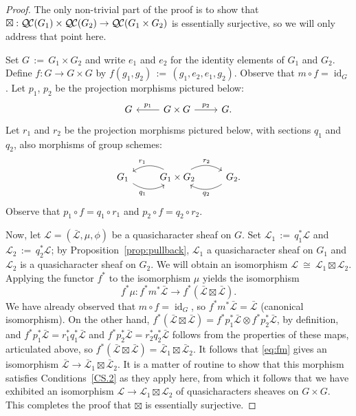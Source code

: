\documentclass[11pt]{amsart}
\theoremstyle{plain}
\theoremstyle{definition}
\theoremstyle{remark}
\DeclareMathOperator{\id}{id}
\newcommand{\ceq}{{\, :=\, }}
\newcommand{\iso}{{\ \cong\ }}
\newcommand{\qcs}[1]{{\mathcal{#1}}}
\newcommand{\gqcs}[1]{{\mathcal{\bar #1}}}
\newcommand{\QC}{{\mathcal{Q\hskip-0.8pt C}}}
\begin{document}
\begin{proof}
The only non-trivial part of the proof is to show that $\boxtimes : \QC(G_1)\times \QC(G_2) \to \QC(G_1\times G_2)$ is essentially surjective, so we will only address that point here.

Set $G \ceq G_1\times G_2$
and write $e_1$ and $e_2$ for the identity elements of $G_1$ and $G_2$.
Define $f : G\to G\times G$ by $f(g_1,g_2) \ceq (g_1,e_2,e_1,g_2)$. 
Observe that $m\circ f = \id_G$. 
Let $p_1$, $p_2$ be the projection morphisms pictured below:
\[
\begin{tikzcd}
G & \arrow[swap]{l}{p_1} G\times G \arrow{r}{p_2} & G.
\end{tikzcd}
\]
Let $r_1$ and $r_2$ be the projection morphisms pictured below, with sections $q_1$ and $q_2$, also morphisms of group schemes:
\[
\begin{tikzcd}
G_1  \arrow[swap, bend right]{r}{q_1} &
\arrow[swap, bend right]{l}{r_1} G_1\times G_2 \arrow[bend left]{r}{r_2} &
\arrow[bend left]{l}{q_2} G_2.
\end{tikzcd}
\]
Observe that $p_1\circ f = q_1 \circ r_1$ and $p_2 \circ f = q_2\circ r_2$.

Now, let $\qcs{L} = (\gqcs{L},\mu,\phi)$ be a quasicharacter sheaf on $G$. 
Set $\qcs{L}_1 \ceq q_1^* \qcs{L}$ and $\qcs{L}_2 \ceq q_2^* \qcs{L}$;
by Proposition~\ref{prop:pullback}, $\qcs{L}_1$ a quasicharacter sheaf on $G_1$ 
and $\qcs{L}_2$ is a quasicharacter sheaf on $G_2$.
We will obtain an isomorphism $\qcs{L} \iso  \qcs{L}_1\boxtimes \qcs{L}_2$.
%
Applying the functor $f^*$ to the isomorphism $\mu$ yields the isomorphism
\begin{equation}\label{eq:fm}
f^*\mu : f^* m^* \gqcs{L} \to f^*(\gqcs{L}\boxtimes \gqcs{L}) .
\end{equation}
We have already observed that $m\circ f = \id_G$, so $f^* m^* \gqcs{L} = \gqcs{L}$ (canonical isomorphism).
On the other hand, $f^*(\gqcs{L}\boxtimes \gqcs{L}) = f^*p_1^*\gqcs{L}\otimes f^* p_2^*\gqcs{L}$, 
by definition, and $f^*p_1^*\gqcs{L} = r_1^* q_1^* \gqcs{L}$ and $f^*p_2^*\gqcs{L} = r_2^* q_2^* \gqcs{L}$ follows from the properties of these maps, articulated above, 
so $f^*(\gqcs{L}\boxtimes \gqcs{L}) = \gqcs{L}_1\boxtimes \gqcs{L}_2$.
It follows that \eqref{eq:fm} gives an isomorphism $\gqcs{L} \to  \gqcs{L}_1\boxtimes \gqcs{L}_2$.
It is a matter of routine to show that this morphism satisfies Conditions~\ref{CS.2} as they apply here,
from which it follows that we have exhibited an isomorphism 
$\qcs{L} \to \qcs{L}_1\boxtimes \qcs{L}_2$ of quasicharacters sheaves on $G\times G$.
This completes the proof that $\boxtimes$ is essentially surjective.
\end{proof}
\end{document}
